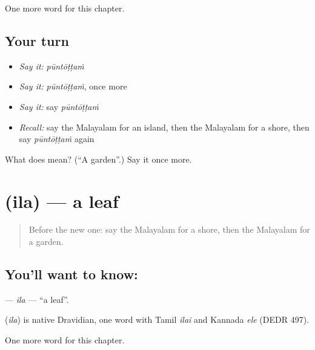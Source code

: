 \begin{grammarlens}[title={What you've built}]
One more word for this chapter.
\end{grammarlens}

\subsection*{Your turn}
\begin{itemize}
\raggedright
  \item \emph{Say it:} \emph{pūntōṭṭaṁ}
  \item \emph{Say it:} \emph{pūntōṭṭaṁ}, once more
  \item \emph{Say it:} say \emph{pūntōṭṭaṁ}
  \item \emph{Recall:} say the Malayalam for an island, then the Malayalam for a shore, then say \emph{pūntōṭṭaṁ} again
\end{itemize}

\begin{tcolorbox}[breakable,colback=teal!4,colframe=teal!35!black,title={Before you move on}]
What does  mean? (\textquotedblleft{}A garden\textquotedblright{}.) Say it once more.
\end{tcolorbox}
\section[\texorpdfstring{\ml{ഇല} (ila)}{ഇല (ila)}]{ (ila) — a leaf}

\label{lesson:ML-C149-ila}



\begin{quote}
Before the new one: say the Malayalam for a shore, then the Malayalam for a garden.
\end{quote}

\subsection*{You'll want to know: }
\textbf{} — \emph{ila} — \textquotedblleft{}a leaf\textquotedblright{}.

\begin{cousinweb}
\textbf{} (\emph{ila}) is native Dravidian, one word with Tamil \emph{ilai} and Kannada \emph{ele} (DEDR 497).
\end{cousinweb}

\begin{grammarlens}[title={What you've built}]
One more word for this chapter.
\end{grammarlens}

